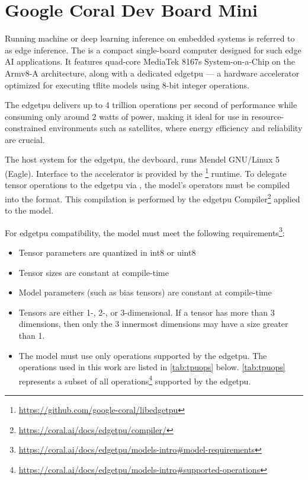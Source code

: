 {\section{Google Coral Dev Board Mini}
\label{subsec:hardware}

Running machine or deep learning inference on embedded systems is referred to as edge inference.
The  is a compact single-board computer designed for such edge AI applications.
It features quad-core MediaTek 8167s System-on-a-Chip on the Armv8-A architecture,
along with a dedicated \gls{edgetpu} --- a hardware accelerator optimized for executing \gls{tflite} models using 8-bit integer operations.

The \gls{edgetpu} delivers up to 4 trillion operations per second of performance while consuming only around 2 watts of power,
making it ideal for use in resource-constrained environments such as satellites, where energy efficiency and reliability are crucial.

The host system for the \gls{edgetpu}, the \gls{devboard}, runs Mendel GNU/Linux 5 (Eagle).
Interface to the accelerator is provided by the \footnote{\url{https://github.com/google-coral/libedgetpu}} runtime.
To delegate tensor operations to the \gls{edgetpu} via , the model's operators must be compiled into the  format.
This compilation is performed by the \gls{edgetpu} Compiler\footnote{\url{https://coral.ai/docs/edgetpu/compiler/}} applied to the model.

For \gls{edgetpu} compatibility, the model must meet the following requirements\footnote{\url{https://coral.ai/docs/edgetpu/models-intro\#model-requirements}}:

\begin{itemize}
    \item Tensor parameters are quantized in \gls{int8} or \gls{uint8}
    \item Tensor sizes are constant at compile-time
    \item Model parameters (such as bias tensors) are constant at compile-time
    \item Tensors are either 1-, 2-, or 3-dimensional. If a tensor has more than 3 dimensions, then only the 3 innermost dimensions may have a size greater than 1.
    \item The model must use only operations supported by the \gls{edgetpu}. The operations used in this work are listed in \autoref{tab:tpuops} below.
    \autoref{tab:tpuops} represents a subset of all operations\footnote{\url{https://coral.ai/docs/edgetpu/models-intro\#supported-operations}} supported by the \gls{edgetpu}.
\end{itemize}

}
